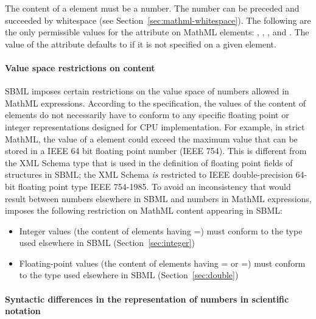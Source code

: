 The content of a  element must be a number.  The number
can be preceded and succeeded by whitespace (see
Section~\ref{sec:mathml-whitespace}).  The following are the only
permissible values for the  attribute on MathML
 elements: , , ,
and .  The value of the  attribute
defaults to  if it is not specified on a given
 element.


\paragraph{Value space restrictions on  content}

SBML imposes certain restrictions on the value space of numbers
allowed in MathML expressions.  According to the \mathmltwo
specification, the values of the content of  elements do
not necessarily have to conform to any specific floating point or
integer representations designed for CPU implementation.  For
example, in strict MathML, the value of a  element could
exceed the maximum value that can be stored in a IEEE 64 bit
floating point number (IEEE 754).  This is different from the XML
Schema type  that is used in the definition of
floating point fields of structures in SBML; the XML Schema
 \emph{is} restricted to IEEE double-precision
64-bit floating point type IEEE 754-1985.  To avoid an
inconsistency that would result between numbers elsewhere in SBML
and numbers in MathML expressions, \sbmltwotwo imposes the
following restriction on MathML content appearing in SBML:
\begin{itemize}
  
\item Integer values (\ie the content of  elements
  having =) must conform to the
   type used elsewhere in SBML
  (Section~\ref{sec:integer})
  
\item Floating-point values (\ie the content of 
  elements having = or
  =) must conform to the
   type used elsewhere in SBML
  (Section~\ref{sec:double})
\end{itemize}


\paragraph{Syntactic differences in the representation of numbers
  in scientific notation}

